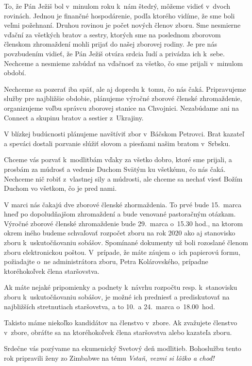 To, že Pán Ježiš bol v~minulom roku k~nám štedrý, môžeme vidieť v~dvoch rovinách. Jednou je  finančné hospodárenie, podľa ktorého vidíme, že sme boli veľmi požehnaní. Druhou rovinou je počet nových členov zboru. Sme nesmierne vďační za všetkých bratov a sestry, ktorých sme na poslednom zborovom členskom zhromaždení mohli prijať do našej zborovej rodiny. Je pre nás povzbudením vidieť, že Pán Ježiš otvára srdcia ľudí a privádza ich k~sebe. Nechceme a nesmieme zabúdať na vďačnosť za všetko, čo sme prijali v~minulom období.

Nechceme sa pozerať iba späť, ale aj dopredu k~tomu, čo nás čaká. Pripravujeme služby pre najbližšie obdobie, plánujeme výročné zborové členské zhromaždenie, organizujeme voľbu správcu zborovej stanice na Chvojnici. Nezabúdame ani na Connect a skupinu bratov a sestier z~Ukrajiny.

V blízkej budúcnosti plánujeme navštíviť zbor v~Báčskom Petrovci. Brat kazateľ a speváci dostali pozvanie slúžiť slovom a piesňami našim bratom v~Srbsku.

Chceme vás pozvať k~modlitbám vďaky za všetko dobro, ktoré sme prijali, a prosbám za múdrosť a vedenie Duchom Svätým ku všetkému, čo nás čaká. Nechceme nič robiť z~vlastnej sily a múdrosti, ale chceme sa nechať viesť Božím Duchom vo všetkom, čo je pred nami.



V marci nás čakajú dve zborové členské zhormaždenia. To prvé bude 15.~marca hneď po dopoludňajšom zhromaždení a bude venované pastoračným otázkam. Výročné zborové členské zhromaždenie bude 29.~marca o~15.30 hod., na ktorom okrem iného budeme schvaľovať rozpočet zboru na rok 2020 ako aj stanovisko zboru k~uskutočňovaniu sobášov. Spomínané dokumenty už boli rozoslané členom zboru elektronickou poštou. V~prípade, že máte záujem o~ich papierovú formu, požiadajte o~ne administrátora zboru, Petra Kolárovského, prípadne ktoréhokoľvek člena staršovstva.

Ak máte nejaké pripomienky a podnety k~návrhu rozpočtu resp. k~stanovisku zboru k~uskutočňovaniu sobášov, je možné ich predniesť a prediskutovať na najbližších stretnutiach staršovstva, a to 10.~a 24.~marca o~18.00~hod.

Takisto máme niekoľko kandidátov na členstvo v~zbore. Ak zvažujete členstvo v~zbore, obráťte sa na ktoréhokoľvek člena staršovstva alebo kazateľa zboru.
\vfill\break


Srdečne vás pozývame na ekumenický Svetový deň modlitieb. Bohoslužbu tento rok pripravili ženy zo Zimbabwe na tému {\em Vstaň, vezmi si lôžko a choď!}

